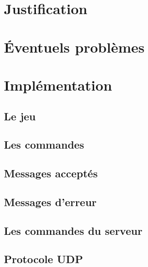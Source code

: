 \documentclass{report}
\begin{document}
	\section{Justification}
		 \label{justification}

	\section{Éventuels problèmes}
		 \label{problemes}
	
	\newpage
	\section{Implémentation}
		\subsection{Le jeu}
			 \label{jeu}
			
		\subsection{Les commandes}
			 \label{commandes}
			
		\subsection{Messages acceptés}
			 \label{messagesAcceptes}
			
		\subsection{Messages d'erreur}
			 \label{messagesRefuses}
			
		\subsection{Les commandes du serveur}
			 \label{commandeServeur}		
		
		\subsection{Protocole UDP}
			 \label{udp}
							
\end{document}

